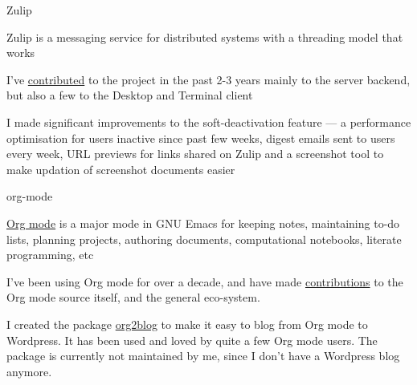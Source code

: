 
\begin{cventries}

  \cventry
      {Zulip}
      {}
      {} %
      {} %
      {
        \begin{cvitems} %
        \item {Zulip is a messaging service for distributed systems with a threading model that works}
        \item {I've \href{https://github.com/zulip/zulip/commits?author=punchagan}{contributed} to the project in the past 2-3 years mainly to the server backend, but also a few to the Desktop and Terminal client}
        \item {I made significant improvements to the soft-deactivation feature --- a performance optimisation for users inactive since past few weeks, digest emails sent to users every week, URL previews for links shared on Zulip and a screenshot tool to make updation of screenshot documents easier}
        \end{cvitems}
      }
  \cventry
      {org-mode}
      {}
      {} %
      {} %
      {
        \begin{cvitems} %
        \item {\href{https://orgmode.org/}{Org mode} is a major mode in GNU Emacs for keeping notes, maintaining to-do lists, planning projects, authoring documents, computational notebooks, literate programming, etc}
        \item I've been using Org mode for over a decade, and have made \href{https://github.com/bzg/org-mode/commits?author=punchagan}{contributions} to the Org mode source itself, and the general eco-system.
        \item I created the package \href{https://github.com/org2blog/org2blog/commits?author=punchagan}{org2blog} to make it easy to blog from  Org mode to Wordpress. It has been used and loved by quite a few Org mode users. The package is currently not maintained by me, since I don't have a Wordpress blog anymore.

\end{cvitems}}
\end{cventries}
